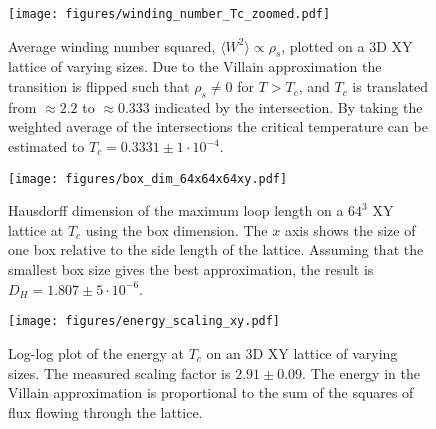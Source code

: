 \begin{figure}[h!]
    \centering
        \texttt{[image: figures/winding\_number\_Tc\_zoomed.pdf]}
    \caption{Average winding number squared, $\langle W^2 \rangle \propto \rho_s$, plotted on a 3D XY lattice of varying sizes. Due to the Villain approximation the transition is flipped such that $\rho_s \neq 0$ for $T > T_c$, and $T_c$ is translated from $\approx 2.2$ \cite{Gottlob:CritBehaviour3DXY} to $\approx 0.333$ indicated by the intersection. By taking the weighted average of the intersections the critical temperature can be estimated to $T_c = 0.3331 \pm 1 \cdot 10^{-4}$.}
    \label{fig:results_windingnumberTcZoomed}
\end{figure}

\begin{figure}[h!]
    \centering
        \texttt{[image: figures/box\_dim\_64x64x64xy.pdf]}
    \caption{Hausdorff dimension of the maximum loop length on a $64^3$ XY lattice at $T_c$ using the box dimension. The $x$ axis shows the size of one box relative to the side length of the lattice. Assuming that the smallest box size gives the best approximation, the result is $D_H = 1.807 \pm 5 \cdot 10^{-6}$.}
    \label{fig:results_boxdimension}
\end{figure}


\begin{figure}[h!]
    \centering
        \texttt{[image: figures/energy\_scaling\_xy.pdf]}
    \caption{Log-log plot of the energy at $T_c$ on an 3D XY lattice of varying sizes. The measured scaling factor is $2.91 \pm 0.09$. The energy in the Villain approximation is proportional to the sum of the squares of flux flowing through the lattice.}
    \label{fig:results_energyxy}
\end{figure}

